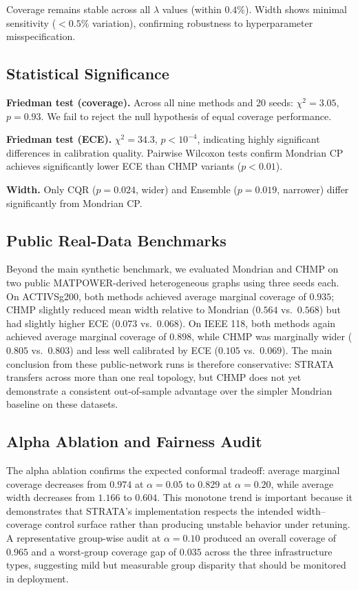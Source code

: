 \documentclass[twoside,11pt]{article}
\begin{document}
Coverage remains stable across all $\lambda$ values (within $0.4\%$). Width
shows minimal sensitivity ($<0.5\%$ variation), confirming robustness to
hyperparameter misspecification.

\subsection{Statistical Significance}

\textbf{Friedman test (coverage).} Across all nine methods and 20 seeds:
$\chi^2 = 3.05$, $p = 0.93$. We fail to reject the null hypothesis of equal
coverage performance.

\textbf{Friedman test (ECE).} $\chi^2 = 34.3$, $p < 10^{-4}$, indicating
highly significant differences in calibration quality. Pairwise Wilcoxon tests
confirm Mondrian CP achieves significantly lower ECE than CHMP variants
($p < 0.01$).

\textbf{Width.} Only CQR ($p = 0.024$, wider) and Ensemble ($p = 0.019$,
narrower) differ significantly from Mondrian CP.

\subsection{Public Real-Data Benchmarks}

Beyond the main synthetic benchmark, we evaluated Mondrian and CHMP on two public
MATPOWER-derived heterogeneous graphs using three seeds each. On ACTIVSg200, both
methods achieved average marginal coverage of $0.935$; CHMP slightly reduced mean
width relative to Mondrian ($0.564$ vs.\ $0.568$) but had slightly higher ECE
($0.073$ vs.\ $0.068$). On IEEE 118, both methods again achieved average marginal
coverage of $0.898$, while CHMP was marginally wider ($0.805$ vs.\ $0.803$) and
less well calibrated by ECE ($0.105$ vs.\ $0.069$). The main conclusion from these
public-network runs is therefore conservative: STRATA transfers across more than
one real topology, but CHMP does not yet demonstrate a consistent out-of-sample
advantage over the simpler Mondrian baseline on these datasets.

\subsection{Alpha Ablation and Fairness Audit}

The alpha ablation confirms the expected conformal tradeoff: average marginal
coverage decreases from $0.974$ at $\alpha=0.05$ to $0.829$ at $\alpha=0.20$,
while average width decreases from $1.166$ to $0.604$. This monotone trend is
important because it demonstrates that STRATA's implementation respects the
intended width--coverage control surface rather than producing unstable behavior
under retuning. A representative group-wise audit at $\alpha=0.10$ produced an
overall coverage of $0.965$ and a worst-group coverage gap of $0.035$ across the
three infrastructure types, suggesting mild but measurable group disparity that
should be monitored in deployment.
\end{document}
